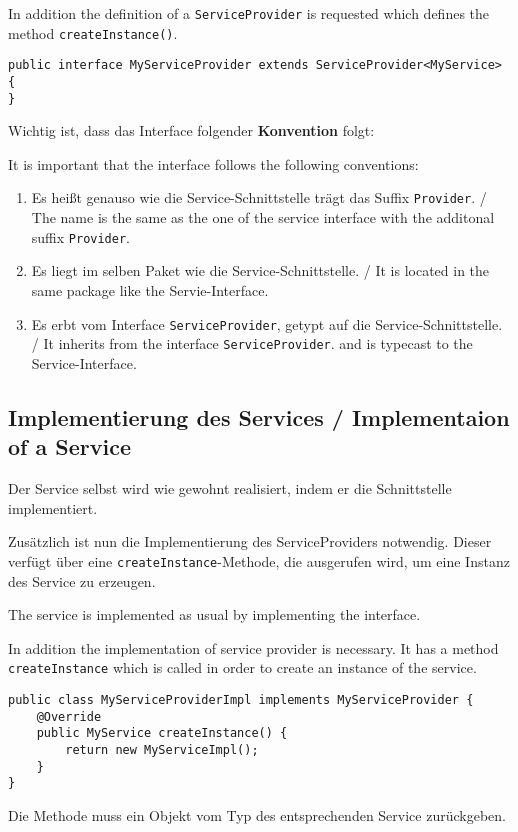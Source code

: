 \documentclass[10pt,a4paper]{scrartcl}
\providecommand{\deng}[2]{#1 / {\sffamily #2}}
\providecommand{\deutsch}[1]{#1}
\providecommand{\englisch}[1]{{\sffamily #1}}
\begin{document}
\englisch{In addition the definition of a \texttt{ServiceProvider} is requested which defines the method \texttt{createInstance()}.}

\begin{lstlisting}
public interface MyServiceProvider extends ServiceProvider<MyService> {
}
\end{lstlisting}

\deutsch{Wichtig ist, dass das Interface folgender \textbf{Konvention} folgt:}

\englisch{It is important that the interface follows the following conventions:}

\begin{enumerate}
 \item \deng{Es heißt genauso wie die Service-Schnittstelle trägt das Suffix \texttt{Provider}.}{The name is the same as the one of the service interface with the additonal suffix \texttt{Provider}.}
 \item \deng{Es liegt im selben Paket wie die Service-Schnittstelle.}{It is located in the same package like the Servie-Interface.}
 \item \deng{Es erbt vom Interface \texttt{ServiceProvider}, getypt auf die Service-Schnittstelle.}{It inherits from the interface \texttt{ServiceProvider}. and is typecast to the Service-Interface.}
\end{enumerate}


\subsection{\deng{Implementierung des Services}{Implementaion of a Service}}
\deutsch{Der Service selbst wird wie gewohnt realisiert, indem er die Schnittstelle implementiert.

Zusätzlich ist nun die Implementierung des ServiceProviders notwendig. Dieser verfügt
über eine \texttt{createInstance}-Methode, die ausgerufen wird, um eine Instanz des Service
zu erzeugen.}

\englisch{The service is implemented as usual by implementing the interface. 

In addition the implementation of service provider is necessary. It has a method \texttt{createInstance} which is called in order to create an instance of the service.}

\begin{lstlisting}
public class MyServiceProviderImpl implements MyServiceProvider {
	@Override
	public MyService createInstance() {
		return new MyServiceImpl();
	}
}
\end{lstlisting}
\deutsch{Die Methode muss ein Objekt vom Typ des entsprechenden Service zurückgeben.}
\end{document}
